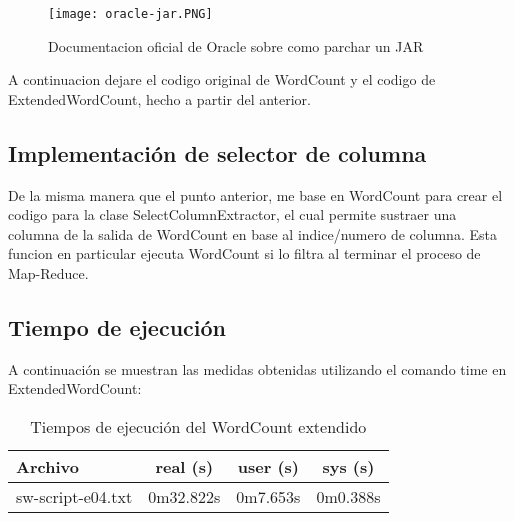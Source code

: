 \documentclass[12pt,letterpaper,twoside]{article}
\begin{document}
\begin{figure}
    \centering
    \texttt{[image: oracle-jar.PNG]}
    \caption{Documentacion oficial de Oracle sobre como parchar un JAR}
    \label{hdfs.PNG}
\end{figure}

\noindent
A continuacion dejare el codigo original de WordCount y el codigo de ExtendedWordCount, hecho a partir del anterior.

\newpage

\begin{code}[H]
    
\end{code}

\newpage

\begin{code}[H]
    
\end{code}

\newpage

\subsection{Implementación de selector de columna}

De la misma manera que el punto anterior, me base en WordCount para crear el codigo para la clase SelectColumnExtractor, el cual permite sustraer
una columna de la salida de WordCount en base al indice/numero de columna. Esta funcion en particular ejecuta WordCount si lo filtra al terminar
el proceso de Map-Reduce.

\newpage

\begin{code}[H]
    
\end{code}

\newpage

\subsection{Tiempo de ejecución}

\noindent
A continuación se muestran las medidas obtenidas utilizando el comando time en ExtendedWordCount:

\begin{table}[h!]
\centering
\begin{tabular}{lccc}
\toprule
\textbf{Archivo} & \textbf{real (s)} & \textbf{user (s)} & \textbf{sys (s)} \\
\midrule
sw-script-e04.txt  & 0m32.822s  & 0m7.653s & 0m0.388s
\bottomrule
\end{tabular}
\caption{Tiempos de ejecución del WordCount extendido}
\end{table}
\end{document}
